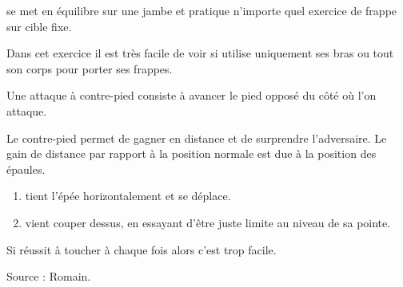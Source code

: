 \begin{exercice}
\A se met en équilibre sur une jambe et pratique n'importe quel exercice de frappe sur cible fixe.

Dans cet exercice il est très facile de voir si \A utilise uniquement ses bras ou tout son corps pour porter ses frappes.
\end{exercice}


\begin{coup}
\label{structure:coup:contre-pied}

Une attaque à contre-pied consiste à avancer le pied opposé du côté où l'on attaque.
\end{coup}

Le contre-pied permet de gagner en distance et de surprendre l'adversaire.
Le gain de distance par rapport à la position normale est due à la position des épaules.


\begin{exercice}

\begin{enumerate}
	\item \D tient l'épée horizontalement et se déplace.
	
	\item \A vient couper dessus, en essayant d'être juste limite au niveau de sa pointe.
\end{enumerate}

Si \A réussit à toucher à chaque fois alors c'est trop facile.

Source : Romain.

\end{exercice}

